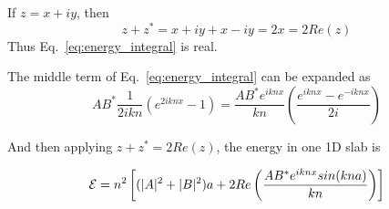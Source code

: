 If $z=x+iy$, then 
\begin{equation}
 z+z^* = x+iy +x-iy = 2x = 2 Re(z)
\end{equation}
Thus Eq.~\ref{eq:energy_integral} is real.

The middle term of Eq.~\ref{eq:energy_integral} can be expanded as
\begin{equation}
 AB^* \frac{1}{2ikn}(e^{2 i k n x}-1) = \frac{AB^* e^{ i k n x}}{kn} \left( \frac{e^{ i k n x} - e^{-i k n x}}{2i}\right)
\end{equation}

And then applying $z+z^*=2 Re(z)$, the energy in one 1D slab is

\begin{equation}
 {\cal E} =  n^2 \left[(|A|^2+|B|^2)a + 2 Re \left(  \frac{AB^* e^{ i k n x} sin(kna)}{kn}\right)\right]
\end{equation}
